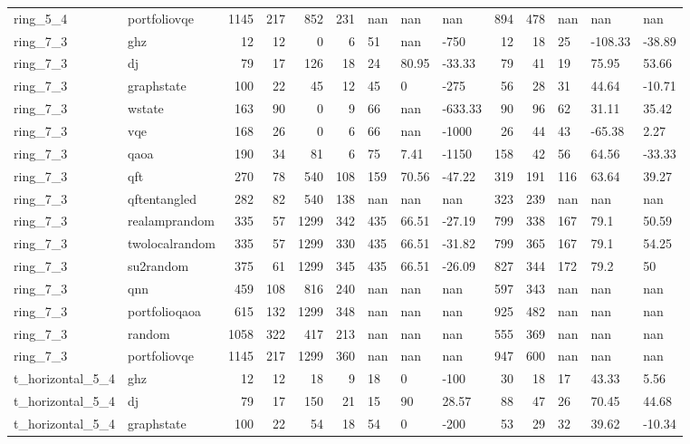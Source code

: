 \begin{longtable}{llrrrrlllrrlll}
ring\_5\_4 & portfoliovqe & 1145 & 217 & 852 & 231 & nan & nan & nan & 894 & 478 & nan & nan & nan \\
ring\_7\_3 & ghz & 12 & 12 & 0 & 6 & 51 & nan & -750 & 12 & 18 & 25 & -108.33 & -38.89 \\
ring\_7\_3 & dj & 79 & 17 & 126 & 18 & 24 & 80.95 & -33.33 & 79 & 41 & 19 & 75.95 & 53.66 \\
ring\_7\_3 & graphstate & 100 & 22 & 45 & 12 & 45 & 0 & -275 & 56 & 28 & 31 & 44.64 & -10.71 \\
ring\_7\_3 & wstate & 163 & 90 & 0 & 9 & 66 & nan & -633.33 & 90 & 96 & 62 & 31.11 & 35.42 \\
ring\_7\_3 & vqe & 168 & 26 & 0 & 6 & 66 & nan & -1000 & 26 & 44 & 43 & -65.38 & 2.27 \\
ring\_7\_3 & qaoa & 190 & 34 & 81 & 6 & 75 & 7.41 & -1150 & 158 & 42 & 56 & 64.56 & -33.33 \\
ring\_7\_3 & qft & 270 & 78 & 540 & 108 & 159 & 70.56 & -47.22 & 319 & 191 & 116 & 63.64 & 39.27 \\
ring\_7\_3 & qftentangled & 282 & 82 & 540 & 138 & nan & nan & nan & 323 & 239 & nan & nan & nan \\
ring\_7\_3 & realamprandom & 335 & 57 & 1299 & 342 & 435 & 66.51 & -27.19 & 799 & 338 & 167 & 79.1 & 50.59 \\
ring\_7\_3 & twolocalrandom & 335 & 57 & 1299 & 330 & 435 & 66.51 & -31.82 & 799 & 365 & 167 & 79.1 & 54.25 \\
ring\_7\_3 & su2random & 375 & 61 & 1299 & 345 & 435 & 66.51 & -26.09 & 827 & 344 & 172 & 79.2 & 50 \\
ring\_7\_3 & qnn & 459 & 108 & 816 & 240 & nan & nan & nan & 597 & 343 & nan & nan & nan \\
ring\_7\_3 & portfolioqaoa & 615 & 132 & 1299 & 348 & nan & nan & nan & 925 & 482 & nan & nan & nan \\
ring\_7\_3 & random & 1058 & 322 & 417 & 213 & nan & nan & nan & 555 & 369 & nan & nan & nan \\
ring\_7\_3 & portfoliovqe & 1145 & 217 & 1299 & 360 & nan & nan & nan & 947 & 600 & nan & nan & nan \\
t\_horizontal\_5\_4 & ghz & 12 & 12 & 18 & 9 & 18 & 0 & -100 & 30 & 18 & 17 & 43.33 & 5.56 \\
t\_horizontal\_5\_4 & dj & 79 & 17 & 150 & 21 & 15 & 90 & 28.57 & 88 & 47 & 26 & 70.45 & 44.68 \\
t\_horizontal\_5\_4 & graphstate & 100 & 22 & 54 & 18 & 54 & 0 & -200 & 53 & 29 & 32 & 39.62 & -10.34 \\

\end{longtable}
